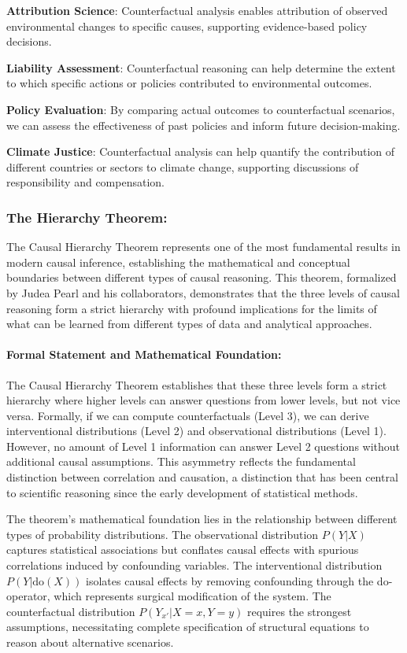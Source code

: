 \textbf{Attribution Science}: Counterfactual analysis enables attribution of observed environmental changes to specific causes, supporting evidence-based policy decisions.

\textbf{Liability Assessment}: Counterfactual reasoning can help determine the extent to which specific actions or policies contributed to environmental outcomes.

\textbf{Policy Evaluation}: By comparing actual outcomes to counterfactual scenarios, we can assess the effectiveness of past policies and inform future decision-making.

\textbf{Climate Justice}: Counterfactual analysis can help quantify the contribution of different countries or sectors to climate change, supporting discussions of responsibility and compensation.

\subsubsection{The Hierarchy Theorem:}

The Causal Hierarchy Theorem represents one of the most fundamental results in modern causal inference, establishing the mathematical and conceptual boundaries between different types of causal reasoning. This theorem, formalized by Judea Pearl and his collaborators, demonstrates that the three levels of causal reasoning form a strict hierarchy with profound implications for the limits of what can be learned from different types of data and analytical approaches.

\paragraph{Formal Statement and Mathematical Foundation:}

The Causal Hierarchy Theorem establishes that these three levels form a strict hierarchy where higher levels can answer questions from lower levels, but not vice versa. Formally, if we can compute counterfactuals (Level 3), we can derive interventional distributions (Level 2) and observational distributions (Level 1). However, no amount of Level 1 information can answer Level 2 questions without additional causal assumptions. This asymmetry reflects the fundamental distinction between correlation and causation, a distinction that has been central to scientific reasoning since the early development of statistical methods.

The theorem's mathematical foundation lies in the relationship between different types of probability distributions. The observational distribution $P(Y|X)$ captures statistical associations but conflates causal effects with spurious correlations induced by confounding variables. The interventional distribution $P(Y|\text{do}(X))$ isolates causal effects by removing confounding through the do-operator, which represents surgical modification of the system. The counterfactual distribution $P(Y_{x'}|X=x, Y=y)$ requires the strongest assumptions, necessitating complete specification of structural equations to reason about alternative scenarios.

